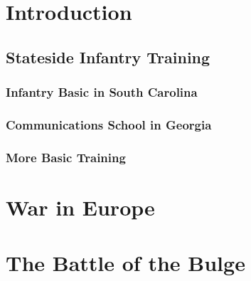



\frontmatter
% 


\tableofcontents

\mainmatter
\part*{Introduction}\label{introduction}

\chapter{Stateside Infantry Training}\label{stateside-infantry-training}


\section{Infantry Basic in South Carolina}\label{infantry-basic}


\section{Communications School in Georgia}\label{communications-school}


\section{More Basic Training}\label{more-basic-training}


\part*{War in Europe}\label{war-in-europe}


\part*{The Battle of the Bulge}\label{battle-of-the-bulge}

